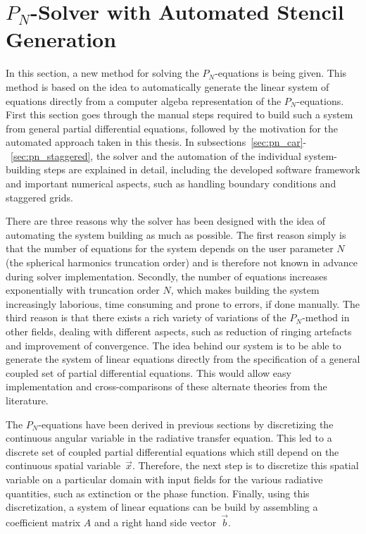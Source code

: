 \section{$P_N$-Solver with Automated Stencil Generation}
\label{sec:pn_solver}

In this section, a new method for solving the $P_N$-equations is being given. This method is based on the idea to automatically generate the linear system of equations directly from a computer algeba representation of the $P_N$-equations. First this section goes through the manual steps required to build such a system from general partial differential equations, followed by the motivation for the automated approach taken in this thesis. In subsections~\ref{sec:pn_car}-~\ref{sec:pn_staggered}, the solver and the automation of the individual system-building steps are explained in detail, including the developed software framework and important numerical aspects, such as handling boundary conditions and staggered grids.

There are three reasons why the solver has been designed with the idea of automating the system building as much as possible. The first reason simply is that the number of equations for the system depends on the user parameter $N$ (the spherical harmonics truncation order) and is therefore not known in advance during solver implementation. Secondly, the number of equations increases exponentially with truncation order $N$, which makes building the system increasingly laborious, time consuming and prone to errors, if done manually. The third reason is that there exists a rich variety of variations of the $P_N$-method in other fields, dealing with different aspects, such as reduction of ringing artefacts and improvement of convergence. The idea behind our system is to be able to generate the system of linear equations directly from the specification of a general coupled set of partial differential equations. This would allow easy implementation and cross-comparisons of these alternate theories from the literature.

The $P_N$-equations have been derived in previous sections by discretizing the continuous angular variable in the radiative transfer equation. This led to a discrete set of coupled partial differential equations which still depend on the continuous spatial variable~$\vec{x}$. Therefore, the next step is to discretize this spatial variable on a particular domain with input fields for the various radiative quantities, such as extinction or the phase function. Finally, using this discretization, a system of linear equations can be build by assembling a coefficient matrix $A$ and a right hand side vector~$\vec{b}$.

